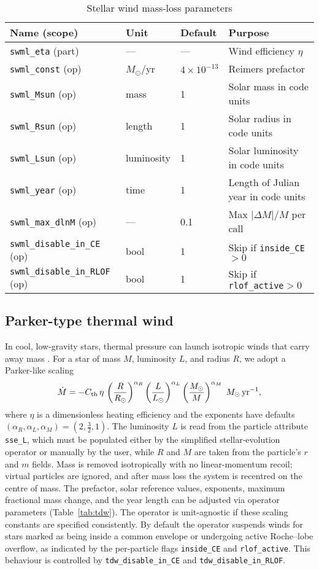 \documentclass[11pt]{article}
\begin{document}
\begin{table}[h]
\centering\footnotesize
\caption{Stellar wind mass-loss parameters}
\label{tab:swml}
\begin{tabular}{@{}llll@{}}
\toprule
Name (scope) & Unit & Default & Purpose \\
\midrule
\texttt{swml\_eta} (part) & — & — & Wind efficiency $\eta$\\
\texttt{swml\_const} (op) & $M_\odot$/yr & $4\times10^{-13}$ & Reimers prefactor\\
\texttt{swml\_Msun}  (op) & mass & 1 & Solar mass in code units\\
\texttt{swml\_Rsun}  (op) & length & 1 & Solar radius in code units\\
\texttt{swml\_Lsun}  (op) & luminosity & 1 & Solar luminosity in code units\\
\texttt{swml\_year}  (op) & time & 1 & Length of Julian year in code units\\
\texttt{swml\_max\_dlnM} (op) & — & 0.1 & Max $|\Delta M|/M$ per call\\
\texttt{swml\_disable\_in\_CE} (op) & bool & 1 & Skip if \texttt{inside\_CE}$>0$\\
\texttt{swml\_disable\_in\_RLOF} (op) & bool & 1 & Skip if \texttt{rlof\_active}$>0$\\
\bottomrule
\end{tabular}
\end{table}

\subsection{Parker-type thermal wind}
\label{sec:tdw}

In cool, low-gravity stars, thermal pressure can launch isotropic winds that carry away mass \citep{parker}. For a star
of mass $M$, luminosity $L$, and radius $R$, we adopt a Parker-like scaling
\[
\dot M = -C_{\rm th}\,\eta\,\left(\frac{R}{R_\odot}\right)^{\alpha_R}
                   \left(\frac{L}{L_\odot}\right)^{\alpha_L}
                   \left(\frac{M_\odot}{M}\right)^{\alpha_M}
\;M_\odot\,\mathrm{yr}^{-1},
\]
where $\eta$ is a dimensionless heating efficiency and the exponents have
defaults $(\alpha_R,\alpha_L,\alpha_M)=(2,\tfrac{3}{2},1)$.  The luminosity
$L$ is read from the particle attribute \texttt{sse\_L}, which must be
populated either by the simplified stellar‑evolution operator or manually by
the user, while $R$ and $M$ are taken from the particle's $r$ and $m$ fields.
Mass is removed isotropically
with no linear-momentum recoil; virtual particles are ignored, and after mass
loss the system is recentred on the centre of mass.  The prefactor, solar
reference values, exponents, maximum fractional mass change, and the year
length can be adjusted via operator parameters (Table~\ref{tab:tdw}). The
operator is unit-agnostic if these scaling constants are specified
consistently.
By default the operator suspends winds for stars marked as being inside a
common envelope or undergoing active Roche--lobe overflow, as indicated by
the per-particle flags \texttt{inside\_CE} and \texttt{rlof\_active}.  This
behaviour is controlled by \texttt{tdw\_disable\_in\_CE} and
\texttt{tdw\_disable\_in\_RLOF}.
\end{document}
